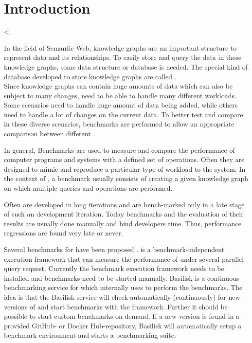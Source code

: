 \chapter{Introduction}
\label{ch:introduction}


<


In the field of Semantic Web, knowledge graphs are an important structure to represent data and its relationships.
To easily store and query the data in these knowledge graphs, some data structure or database is needed.
The special kind of database developed to store knowledge graphs are called \tsp{}. \\

Since knowledge graphs can contain huge amounts of data which can also be subject to many changes, \tsp{} need to be able to handle many different workloads.
Some scenarios need to handle huge amount of data being added, while others need to handle a lot of changes on the current data.
To better test and compare \tsp{} in these diverse scenarios, benchmarks are performed to allow an appropriate comparison between different \tsp{}\cite{saleemHowRepresentativeSPARQL2019}.

In general, Benchmarks are used to measure and compare the performance of computer programs and systems with a defined set of operations.
Often they are designed to mimic and reproduce a particular type of workload to the system.
In the context of \tsp{}, a benchmark usually consists of creating a given knowledge graph on which multiple queries and operations are performed.

Often \tsp{} are developed in long iterations and are bench-marked only in a late stage of such an development iteration.
Today benchmarks and the evaluation of their results are usually done manually and bind developers time.
Thus, performance regressions are  found very late or never.


Several benchmarks for \tsp{} have been proposed \cite{saleemHowRepresentativeSPARQL2019}.
\iguana{} is a benchmark-independent execution framework \cite{conradsIguanaGenericFramework2017} that can measure the performance of \tsp{} under several parallel query request.
Currently the benchmark execution framework needs to be installed and benchmarks need to be started manually.
Basilisk is a continuous benchmarking service for \tsp{} which internally uses \iguana{} to perform the benchmarks.
The idea is that the Basilisk service will check automatically (continuously) for new versions of \tsp{} and start benchmarks with the \iguana{} framework.
Further it should be possible to start custom benchmarks on demand.
If a new version is found in a provided GitHub- or Docker Hub-repository, Basilisk will automatically setup a benchmark environment and starts a benchmarking suite.

